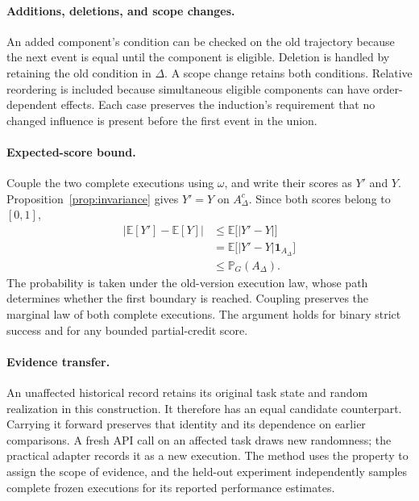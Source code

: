 \documentclass{ecai}
\newcommand{\E}{\mathbb{E}}
\newcommand{\Prob}{\mathbb{P}}
\newcommand{\ind}{\mathbf{1}}
\begin{document}
\paragraph{Additions, deletions, and scope changes.}
An added component's condition can be checked on the old trajectory because the next event is equal until the component is eligible. Deletion is handled by retaining the old condition in $\Delta$. A scope change retains both conditions. Relative reordering is included because simultaneous eligible components can have order-dependent effects. Each case preserves the induction's requirement that no changed influence is present before the first event in the union.

\paragraph{Expected-score bound.}
Couple the two complete executions using $\omega$, and write their scores as $Y'$ and $Y$. Proposition~\ref{prop:invariance} gives $Y'=Y$ on $A_\Delta^c$. Since both scores belong to $[0,1]$,
\begin{align}
\left|\E[Y']-\E[Y]\right|
&\leq \E\bigl[|Y'-Y|\bigr]\\
&=\E\bigl[|Y'-Y|\ind_{A_\Delta}\bigr]\\
&\leq \Prob_G(A_\Delta).
\end{align}
The probability is taken under the old-version execution law, whose path determines whether the first boundary is reached. Coupling preserves the marginal law of both complete executions. The argument holds for binary strict success and for any bounded partial-credit score.

\paragraph{Evidence transfer.}
An unaffected historical record retains its original task state and random realization in this construction. It therefore has an equal candidate counterpart. Carrying it forward preserves that identity and its dependence on earlier comparisons. A fresh API call on an affected task draws new randomness; the practical adapter records it as a new execution. The method uses the property to assign the scope of evidence, and the held-out experiment independently samples complete frozen executions for its reported performance estimates.


\end{document}
